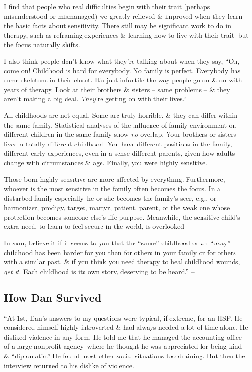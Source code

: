 \documentclass{article}
\numberwithin{equation}{section}
\begin{document}
I find that people who real difficulties begin with their trait (perhaps misunderstood or mismanaged) we greatly relieved \& improved when they learn the basic facts about sensitivity. There still may be significant work to do in therapy, such as reframing experiences \& learning how to live with their trait, but the focus naturally shifts.

I also think people don't know what they're talking about when they say, ``Oh, come on! Childhood is hard for everybody. No family is perfect. Everybody has some skeletons in their closet. It's just infantile the way people go on \& on with years of therapy. Look at their brothers \& sisters -- same problems -- \& they aren't making a big deal. \textit{They}'re getting on with their lives.''

All childhoods are not equal. Some are truly horrible. \& they can differ within the same family. Statistical analyses of the influence of family environment on different children in the same family show \textit{no} overlap. Your brothers or sisters lived a totally different childhood. You have different positions in the family, different early experiences, even in a sense different parents, given how adults change with circumstances \& age. Finally, you were highly sensitive.

Those born highly sensitive are more affected by everything. Furthermore, whoever is the most sensitive in the family often becomes the focus. In a disturbed family especially, he or she becomes the family's seer, e.g., or harmonizer, prodigy, target, martyr, patient, parent, or the weak one whose protection becomes someone else's life purpose. Meanwhile, the sensitive child's extra need, to learn to feel secure in the world, is overlooked.

In sum, believe it if it seems to you that the ``same'' childhood or an ``okay'' childhood has been harder for you than for others in your family or for others with a similar past. \& if you think you need therapy to heal childhood wounds, \textit{get it}. Each childhood is its own story, deserving to be heard.'' -- \cite[pp. 199--201]{Aron2013}

\subsection{How Dan Survived}
``At 1st, Dan's answers to my questions were typical, if extreme, for an HSP. He considered himself highly introverted \& had always needed a lot of time alone. He disliked violence in any form. He told me that he managed the accounting office of a large nonprofit agency, where he thought he was appreciated for being kind \& ``diplomatic.'' He found most other social situations too draining. But then the interview returned to his dislike of violence.
\end{document}
